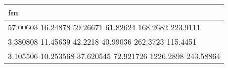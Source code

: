 \begin{tabular}{l}
fm \\ 
\hline 
57.00603      16.24878      59.26671      61.82624      168.2682      223.9111 \\ 
3.380808      11.45639       42.2218      40.99036      262.3723      115.4451 \\ 
3.105506      10.253568      37.620545      72.921726      1226.2898      243.58864 \\ 
\hline 
\end{tabular}